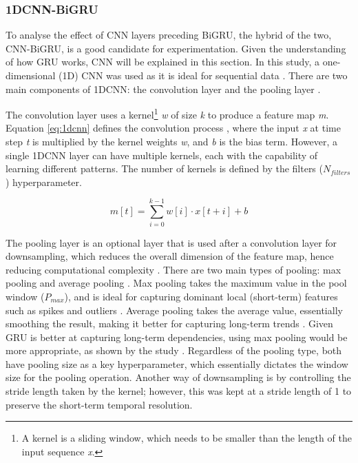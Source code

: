 \documentclass[ %
                    author={Raj Dhakan},
                supervisor={Dr. Ayush Joshi},
                    degree={MSc},
                     title={Ethereum Price Prediction using Internal and External Factors},
                  subtitle={},
                      type={},
                      year={2025}]{dissertation}
\begin{document}
\subsubsection{1DCNN-BiGRU}
To analyse the effect of CNN layers preceding BiGRU, the hybrid of the two, CNN-BiGRU, is a good candidate for experimentation. Given the understanding of how GRU works, CNN will be explained in this section. In this study, a one-dimensional (1D) CNN was used as it is ideal for sequential data \cite{hoa2025hybrid}. There are two main components of 1DCNN: the convolution layer and the pooling layer \cite{mazinani2025deep}. 

The convolution layer uses a kernel\footnote{A kernel is a sliding window, which needs to be smaller than the length of the input sequence \textit{x}.} \textit{w} of size \textit{k} to produce a feature map \textit{m}. Equation \ref{eq:1dcnn} defines the convolution process \cite{hoa2025hybrid}, where the input \textit{x} at time step \textit{t} is multiplied by the kernel weights \textit{w}, and \textit{b} is the bias term. However, a single 1DCNN layer can have multiple kernels, each with the capability of learning different patterns. The number of kernels is defined by the filters ($N_{filters}$) hyperparameter. 

\begin{equation}
\label{eq:1dcnn}
m[t] = \sum_{i=0}^{k-1} w[i] \cdot x[t + i] + b
\end{equation}

The pooling layer is an optional layer that is used after a convolution layer for downsampling, which reduces the overall dimension of the feature map, hence reducing computational complexity \cite{zhao2024improved}. There are two main types of pooling: max pooling and average pooling \cite{zhao2024improved}. Max pooling takes the maximum value in the pool window ($P_{max}$), and is ideal for capturing dominant local (short-term) features such as spikes and outliers \cite{zhao2024improved}. Average pooling takes the average value, essentially smoothing the result, making it better for capturing long-term trends \cite{zhao2024improved}. Given GRU is better at capturing long-term dependencies, using max pooling would be more appropriate, as shown by the study \cite{mazinani2025deep}. Regardless of the pooling type, both have pooling size as a key hyperparameter, which essentially dictates the window size for the pooling operation. Another way of downsampling is by controlling the stride length taken by the kernel; however, this was kept at a stride length of 1 to preserve the short-term temporal resolution. 
\end{document}
